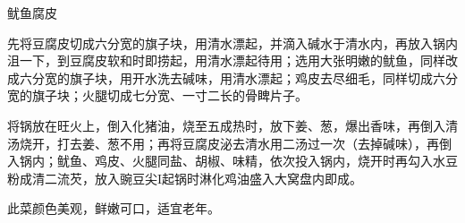 \begin{recipe}{鱿鱼腐皮}

\ingredients



\cooking

\step 先将豆腐皮切成六分宽的旗子块，用清水漂起，并滴入碱水于清水内，再放入锅内沮一下，到豆腐皮软和时即捞起，用清水漂起待用；选用大张明嫩的鱿鱼，同样改成六分宽的旗子块，用开水洗去碱味，用清水漂起；鸡皮去尽细毛，同样切成六分宽的旗子块；火腿切成七分宽、一寸二长的骨睥片子。

\step 将锅放在旺火上，倒入化猪油，烧至五成热时，放下姜、葱，爆出香味，再倒入清汤烧开，打去姜、葱不用；再将豆腐皮泌去清水用二汤过一次（去掉碱味），再倒入锅内；鱿鱼、鸡皮、火腿同盐、胡椒、味精，依次投入锅内，烧开时再勾入水豆粉成清二流芡，放入豌豆尖I起锅时淋化鸡油盛入大窝盘内即成。

\notes

此菜颜色美观，鲜嫩可口，适宜老年。

\end{recipe}

